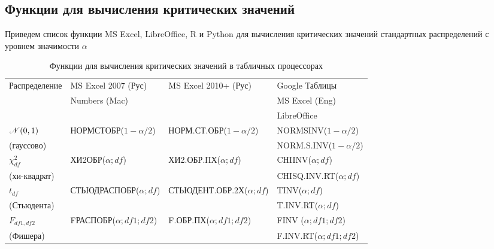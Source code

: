\documentclass[12pt]{article}
\begin{document}
\begin{landscape}

\section{Функции для вычисления критических значений}

Приведем список функции MS Excel, LibreOffice, R и Python для вычисления критических
значений стандартных распределений с уровнем значимости  $\alpha$
\begin{table}[h]
\caption{Функции для вычисления критических значений в табличных процессорах}
\begin{center}
{\small
\begin{tabular}{|l|l|l|l|}
	\hline
	Распределение & MS Excel 2007 (Рус) & MS Excel 2010+ (Рус) & Google Таблицы  \\
	 & Numbers (Mac)  &  & MS Excel (Eng) \\
	& & & LibreOffice \\ \hline \hline  %
	${\mathscr N}(0,1)$ &  НОРМСТОБР($1-\alpha/2$) & НОРМ.СТ.ОБР($1-\alpha/2$) &
	NORMSINV($1-\alpha/2$)  \\
	(гауссово) & & & NORM.S.INV($1-\alpha/2$) \\ \hline
	$\chi^2_{df}$ & ХИ2ОБР($\alpha;df$) & ХИ2.ОБР.ПХ($\alpha;df$) & 
	CHIINV($\alpha;df$) \\ 
	(хи-квадрат) & & & CHISQ.INV.RT($\alpha;df$) \\ \hline
	$t_{df}$   & СТЬЮДРАСПОБР($\alpha;df$)  &  СТЬЮДЕНТ.ОБР.2Х($\alpha;df$) & 
	TINV($\alpha;df$) \\  
	(Стьюдента) & & & T.INV.RT($\alpha;df$)  \\ \hline
	$F_{df1,df2}$ & FРАСПОБР($\alpha;df1;df2$) & F.ОБР.ПХ($\alpha;df1;df2$) & 
	FINV ($\alpha;df1;df2$) \\ 
	(Фишера) & & & F.INV.RT($\alpha;df1;df2$) \\  \hline
\end{tabular}
}
\end{center}
\end{table}

\end{landscape}
\end{document}
